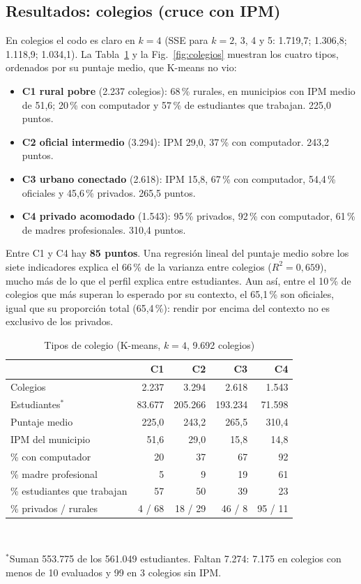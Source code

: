 \documentclass[conference]{IEEEtran}
\begin{document}
\subsection{Resultados: colegios (cruce con IPM)}
En colegios el codo es claro en $k=4$ (SSE para $k=2$, 3, 4 y 5: 1.719,7; 1.306,8; 1.118,9; 1.034,1). La Tabla~\ref{tab:colegios} y la Fig.~\ref{fig:colegios} muestran los cuatro tipos, ordenados por su puntaje medio, que K-means no vio:
\begin{itemize}
\item \textbf{C1 rural pobre} (2.237 colegios): 68\,\% rurales, en municipios con IPM medio de 51,6; 20\,\% con computador y 57\,\% de estudiantes que trabajan. 225,0 puntos.
\item \textbf{C2 oficial intermedio} (3.294): IPM 29,0, 37\,\% con computador. 243,2 puntos.
\item \textbf{C3 urbano conectado} (2.618): IPM 15,8, 67\,\% con computador, 54,4\,\% oficiales y 45,6\,\% privados. 265,5 puntos.
\item \textbf{C4 privado acomodado} (1.543): 95\,\% privados, 92\,\% con computador, 61\,\% de madres profesionales. 310,4 puntos.
\end{itemize}
Entre C1 y C4 hay \textbf{85 puntos}. Una regresión lineal del puntaje medio sobre los siete indicadores explica el 66\,\% de la varianza entre colegios ($R^2=0{,}659$), mucho más de lo que el perfil explica entre estudiantes. Aun así, entre el 10\,\% de colegios que más superan lo esperado por su contexto, el 65,1\,\% son oficiales, igual que su proporción total (65,4\,\%): rendir por encima del contexto no es exclusivo de los privados.

\begin{table}[t]
\caption{Tipos de colegio (K-means, $k=4$, 9.692 colegios)}
\label{tab:colegios}
\centering\small\setlength{\tabcolsep}{3.5pt}
\begin{tabular}{lrrrr}
\toprule
 & C1 & C2 & C3 & C4 \\
\midrule
Colegios & 2.237 & 3.294 & 2.618 & 1.543 \\
Estudiantes$^{*}$ & 83.677 & 205.266 & 193.234 & 71.598 \\
Puntaje medio & 225,0 & 243,2 & 265,5 & 310,4 \\
IPM del municipio & 51,6 & 29,0 & 15,8 & 14,8 \\
\% con computador & 20 & 37 & 67 & 92 \\
\% madre profesional & 5 & 9 & 19 & 61 \\
\% estudiantes que trabajan & 57 & 50 & 39 & 23 \\
\% privados / rurales & 4 / 68 & 18 / 29 & 46 / 8 & 95 / 11 \\
\bottomrule
\end{tabular}\\[2pt]
\parbox{0.95\columnwidth}{\footnotesize $^{*}$Suman 553.775 de los 561.049 estudiantes. Faltan 7.274: 7.175 en colegios con menos de 10 evaluados y 99 en 3 colegios sin IPM.}
\end{table}
\end{document}

